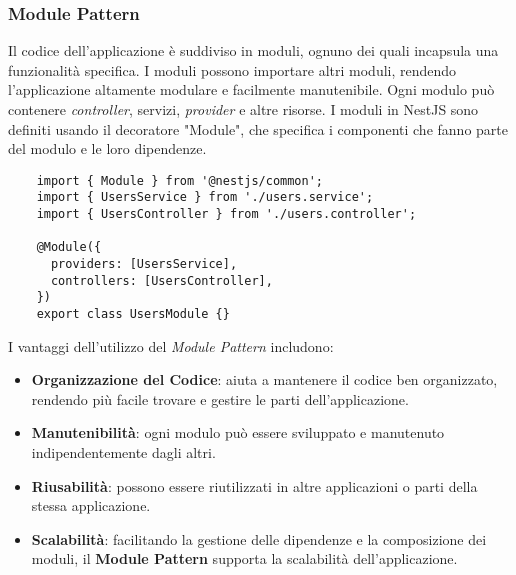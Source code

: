 \subsubsection{Module Pattern}
Il codice dell'applicazione è suddiviso in moduli, ognuno dei quali incapsula una funzionalità specifica. 
I moduli possono importare altri moduli, rendendo l'applicazione altamente modulare e facilmente manutenibile.
Ogni modulo può contenere \textit{controller}, servizi, \textit{provider} e altre risorse.
I moduli in NestJS sono definiti usando il decoratore "Module", che specifica i componenti che fanno parte del modulo e le loro dipendenze.
\begin{lstlisting}
	import { Module } from '@nestjs/common';
	import { UsersService } from './users.service';
	import { UsersController } from './users.controller';
	
	@Module({
	  providers: [UsersService],
	  controllers: [UsersController],
	})
	export class UsersModule {}
\end{lstlisting}
I vantaggi dell'utilizzo del \textit{Module Pattern} includono:
\begin{itemize}
	\item \textbf{Organizzazione del Codice}: aiuta a mantenere il codice ben organizzato, rendendo più facile trovare e gestire le parti dell'applicazione.
	\item \textbf{Manutenibilità}: ogni modulo può essere sviluppato e manutenuto indipendentemente dagli altri.
	\item \textbf{Riusabilità}: possono essere riutilizzati in altre applicazioni o parti della stessa applicazione.
	\item \textbf{Scalabilità}: facilitando la gestione delle dipendenze e la composizione dei moduli, il \textbf{Module Pattern} supporta la scalabilità dell'applicazione.
\end{itemize}



